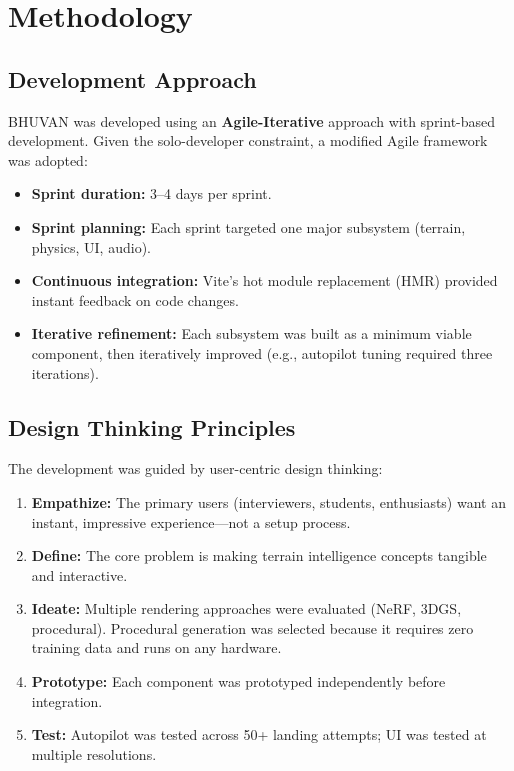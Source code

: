 \chapter{Methodology}

\section{Development Approach}
BHUVAN was developed using an \textbf{Agile-Iterative} approach with sprint-based development. Given the solo-developer constraint, a modified Agile framework was adopted:

\begin{itemize}
    \item \textbf{Sprint duration:} 3--4 days per sprint.
    \item \textbf{Sprint planning:} Each sprint targeted one major subsystem (terrain, physics, UI, audio).
    \item \textbf{Continuous integration:} Vite's hot module replacement (HMR) provided instant feedback on code changes.
    \item \textbf{Iterative refinement:} Each subsystem was built as a minimum viable component, then iteratively improved (e.g., autopilot tuning required three iterations).
\end{itemize}

\section{Design Thinking Principles}
The development was guided by user-centric design thinking:

\begin{enumerate}
    \item \textbf{Empathize:} The primary users (interviewers, students, enthusiasts) want an instant, impressive experience---not a setup process.
    \item \textbf{Define:} The core problem is making terrain intelligence concepts tangible and interactive.
    \item \textbf{Ideate:} Multiple rendering approaches were evaluated (NeRF, 3DGS, procedural). Procedural generation was selected because it requires zero training data and runs on any hardware.
    \item \textbf{Prototype:} Each component was prototyped independently before integration.
    \item \textbf{Test:} Autopilot was tested across 50+ landing attempts; UI was tested at multiple resolutions.
\end{enumerate}

